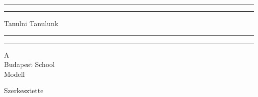 \begin{titlepage} %

	\centering %
	
	\scshape %
	
	\vspace*{\baselineskip} %
	
	
	\rule{\textwidth}{1.6pt}\vspace*{-\baselineskip}\vspace*{2pt} %
	\rule{\textwidth}{0.4pt} %
	
	\vspace{0.75\baselineskip} %
	
	{\LARGE Tanulni Tanulunk\\} %
	
	\vspace{0.75\baselineskip} %
	
	\rule{\textwidth}{0.4pt}\vspace*{-\baselineskip}\vspace{3.2pt} %
	\rule{\textwidth}{1.6pt} %
	
	\vspace{2\baselineskip} %
	
	
	
    A\\
    Budapest School\\
    Modell
	
	\vspace*{3\baselineskip} %
	
	
	Szerkesztette
	
	\vspace{0.5\baselineskip} %
	

\end{titlepage}
